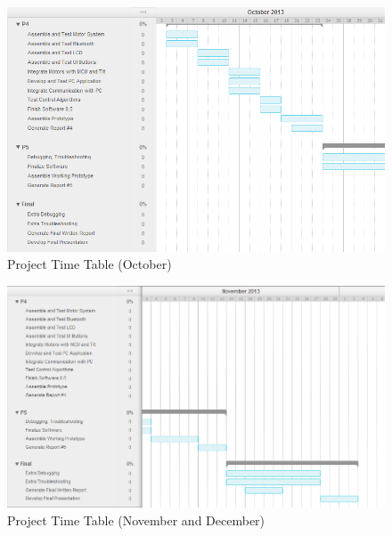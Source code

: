 	\begin{figure}[H]
		\centering
			\includegraphics[scale=0.60]{img/ptt-3}
		\caption{Project Time Table (October)}
	\end{figure}

	\begin{figure}[H]
		\centering
			\includegraphics[scale=0.60]{img/ptt-4}
		\caption{Project Time Table (November and December)}
	\end{figure}